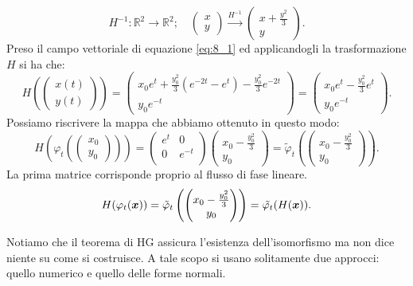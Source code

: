 \begin{exmp}
\[
    H^{-1}:\mathbb{R}^2\to \mathbb{R}^2; \quad  
    \begin{pmatrix} x \\ y \end{pmatrix} \xrightarrow{H^{-1}} \begin{pmatrix} x + \frac{y^2}{3} \\ y \end{pmatrix}
.\] 
Preso il campo vettoriale di equazione \ref{eq:8_1} ed applicandogli la trasformazione $H$ si ha che:
\[
    H\left(\begin{pmatrix} x(t)  \\ y(t)  \end{pmatrix}\right) = 
    \begin{pmatrix} x_0e^t + \frac{y_0^2}{3}(e^{-2t}-e^t) - \frac{y_0^2}{3}e^{-2t}  \\ y_0e^{-t} \end{pmatrix} =
    \begin{pmatrix} x_0e^t-\frac{y_0^2}{3}e^t \\ y_0e^{-t} \end{pmatrix}
.\] 
Possiamo riscrivere la mappa che abbiamo ottenuto in questo modo:
\[
    H\left(\varphi_t\left(\begin{pmatrix} x_0 \\ y_0 \end{pmatrix}\right) \right) =
\begin{pmatrix}
    e^t & 0 \\
    0 & e^{-t} \\
\end{pmatrix}
\begin{pmatrix} x_0-\frac{y_0^2}{3} \\ y_0 \end{pmatrix} = \tilde{\varphi}_t\left(\begin{pmatrix} x_0-\frac{y_0^2}{3} \\ y_0 \end{pmatrix}\right)
.\] 
La prima matrice corrisponde proprio al flusso di fase lineare.
\[
    H(\varphi_t(\boldsymbol{x})) = \tilde{\varphi}_t \left(\begin{pmatrix} x_0-\frac{y_0^2}{3} \\ y_0 \end{pmatrix}\right) = 
    \tilde{\varphi_t}(H(\boldsymbol{x}))
.\] 
\end{exmp}
\noindent
Notiamo che il teorema di HG assicura l'esistenza dell'isomorfismo ma non dice niente su come si costruisce. A tale scopo si usano solitamente due approcci: quello numerico e quello delle forme normali. \\

